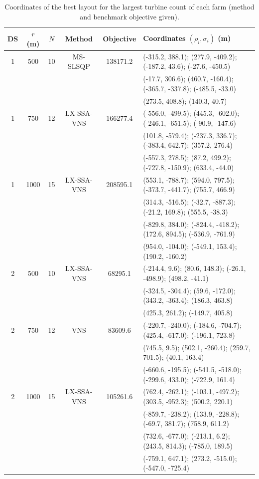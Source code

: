 \documentclass[journal,twoside]{IEEEtran}
\begin{document}
\begin{table}[!t]
\centering
\caption{Coordinates of the best layout for the largest turbine count of each farm (method and benchmark objective given).}
\label{tab:coords}
\scriptsize\setlength{\tabcolsep}{3pt}
\begin{tabular}{ccccc l}
\toprule
DS & $r$ (m) & $N$ & Method & Objective & Coordinates $(\rho_i,\sigma_i)$ (m) \\
\midrule
1 & 500 & 10 & MS-SLSQP & 138171.2 & (-315.2, 388.1); (277.9, -409.2); (-187.2, 43.6); (-27.6, -450.5) \\
 & & & & & (-17.7, 306.6); (460.7, -160.4); (-365.7, -337.8); (-485.5, -33.0) \\
 & & & & & (273.5, 408.8); (140.3, 40.7) \\
\midrule
1 & 750 & 12 & LX-SSA-VNS & 166277.4 & (-556.0, -499.5); (445.3, -602.0); (-246.1, -651.5); (-90.9, -147.6) \\
 & & & & & (101.8, -579.4); (-237.3, 336.7); (-383.4, 642.7); (357.2, 276.4) \\
 & & & & & (-557.3, 278.5); (87.2, 499.2); (-727.8, -150.9); (633.4, -44.0) \\
\midrule
1 & 1000 & 15 & LX-SSA-VNS & 208595.1 & (553.1, -788.7); (594.0, 797.5); (-373.7, -441.7); (755.7, 466.9) \\
 & & & & & (314.3, -516.5); (-32.7, -887.3); (-21.2, 169.8); (555.5, -38.3) \\
 & & & & & (-829.8, 384.0); (-824.4, -418.2); (172.6, 894.5); (-536.9, -761.9) \\
 & & & & & (954.0, -104.0); (-549.1, 153.4); (190.2, -160.2) \\
\midrule
2 & 500 & 10 & LX-SSA-VNS & 68295.1 & (-214.4, 9.6); (80.6, 148.3); (-26.1, -498.9); (498.2, -41.1) \\
 & & & & & (-324.5, -304.4); (59.6, -172.0); (343.2, -363.4); (186.3, 463.8) \\
 & & & & & (425.3, 261.2); (-149.7, 405.8) \\
\midrule
2 & 750 & 12 & VNS & 83609.6 & (-220.7, -240.0); (-184.6, -704.7); (425.4, -617.0); (-196.1, 723.8) \\
 & & & & & (745.5, 9.5); (502.1, -260.4); (259.7, 701.5); (40.1, 163.4) \\
 & & & & & (-660.6, -195.5); (-541.5, -518.0); (-299.6, 433.0); (-722.9, 161.4) \\
\midrule
2 & 1000 & 15 & LX-SSA-VNS & 105261.6 & (762.4, -262.1); (-103.1, -497.2); (303.5, -952.3); (500.2, 220.1) \\
 & & & & & (-859.7, -238.2); (133.9, -228.8); (-69.7, 381.7); (758.9, 611.2) \\
 & & & & & (732.6, -677.0); (-213.1, 6.2); (243.5, 814.3); (-785.0, 189.5) \\
 & & & & & (-759.1, 647.1); (273.2, -515.0); (-547.0, -725.4) \\
\bottomrule
\end{tabular}
\end{table}
\end{document}
